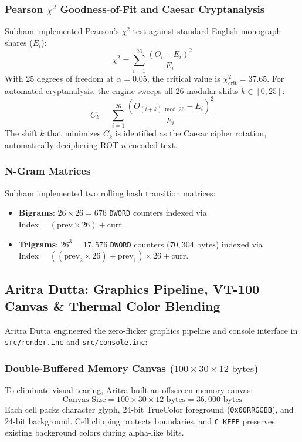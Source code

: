 \documentclass[11pt,a4paper]{article}
\begin{document}
\subsubsection{Pearson $\chi^2$ Goodness-of-Fit and Caesar Cryptanalysis}
Subham implemented Pearson's $\chi^2$ test against standard English monograph shares ($E_i$):
\begin{equation}
  \chi^2 = \sum_{i=1}^{26} \frac{(O_i - E_i)^2}{E_i}
\end{equation}
With 25 degrees of freedom at $\alpha = 0.05$, the critical value is $\chi^2_{\text{crit}} = 37.65$. For automated cryptanalysis, the engine sweeps all 26 modular shifts $k \in [0, 25]$:
\begin{equation}
  C_k = \sum_{i=1}^{26} \frac{(O_{(i+k)\bmod 26} - E_i)^2}{E_i}
\end{equation}
The shift $k$ that minimizes $C_k$ is identified as the Caesar cipher rotation, automatically deciphering ROT-$n$ encoded text.

\subsubsection{N-Gram Matrices}
Subham implemented two rolling hash transition matrices:
\begin{itemize}[leftmargin=*]
  \item \textbf{Bigrams}: $26 \times 26 = 676$ \texttt{DWORD} counters indexed via $\text{Index} = (\text{prev} \times 26) + \text{curr}$.
  \item \textbf{Trigrams}: $26^3 = 17,576$ \texttt{DWORD} counters ($70,304\text{ bytes}$) indexed via $\text{Index} = ((\text{prev}_2 \times 26) + \text{prev}_1) \times 26 + \text{curr}$.
\end{itemize}

\subsection{Aritra Dutta: Graphics Pipeline, VT-100 Canvas \& Thermal Color Blending}
Aritra Dutta engineered the zero-flicker graphics pipeline and console interface in \texttt{src/render.inc} and \texttt{src/console.inc}:

\subsubsection{Double-Buffered Memory Canvas ($100 \times 30 \times 12\text{ bytes}$)}
To eliminate visual tearing, Aritra built an offscreen memory canvas:
\begin{equation}
  \text{Canvas Size} = 100 \times 30 \times 12\text{ bytes} = 36,000\text{ bytes}
\end{equation}
Each cell packs character glyph, 24-bit TrueColor foreground (\texttt{0x00RRGGBB}), and 24-bit background. Cell clipping protects boundaries, and \texttt{C\_KEEP} preserves existing background colors during alpha-like blits.
\end{document}
